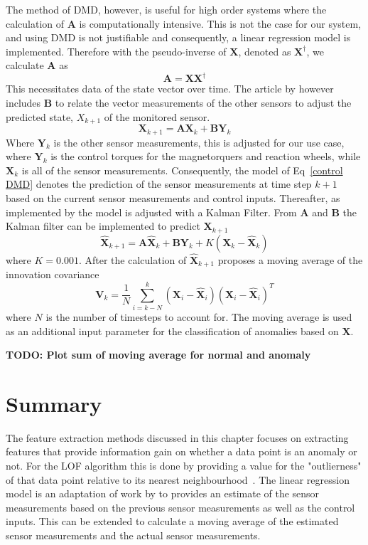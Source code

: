 The method of DMD, however, is useful for high order systems where the calculation of $\mathbf{A}$ is computationally intensive. This is not the case for our system, and using DMD is not justifiable and consequently, a linear regression model is implemented. Therefore with the pseudo-inverse of $\mathbf{X}$, denoted as $\mathbf{X^{\dagger}}$, we calculate $\mathbf{A}$ as
\begin{equation}
	\mathbf{A} = \mathbf{X}\mathbf{X^{\dagger}}
\end{equation}
This necessitates data of the state vector over time. The article by \cite{DeSilva2020} however includes $\mathbf{B}$ to relate the vector measurements of the other sensors to adjust the predicted state, $X_{k+1}$ of the monitored sensor. 
\begin{equation}
	\mathbf{X}_{k+1} = \mathbf{AX}_k + \mathbf{BY}_k
	\label{control DMD}
\end{equation}
Where $\mathbf{Y}_k$ is the other sensor measurements, this is adjusted for our use case, where $\mathbf{Y}_k$ is the control torques for the magnetorquers and reaction wheels, while $\mathbf{X}_k$ is all of the sensor measurements. Consequently, the model of Eq~\ref{control DMD} denotes the prediction of the sensor measurements at time step $k+1$ based on the current sensor measurements and control inputs.
Thereafter, as implemented by \cite{DeSilva2020} the model is adjusted with a Kalman Filter. From $\mathbf{A}$ and $\mathbf{B}$ the Kalman filter can be implemented to predict $\mathbf{X}_{k+1}$
\begin{equation}
	\hat{\mathbf{X}}_{k+1} = \mathbf{A}\hat{\mathbf{X}}_k + \mathbf{B}\mathbf{Y}_k + K(\mathbf{X}_k - \hat{\mathbf{X}}_k)
\end{equation}
where $K = 0.001$. After the calculation of $\hat{\mathbf{X}}_{k+1}$ \cite{DeSilva2020} proposes a moving average of the innovation covariance
\begin{equation}
	\mathbf{V}_k = \frac{1}{N} \sum_{i=k-N}^k (\mathbf{X}_i - \hat{\mathbf{X}}_i)(\mathbf{X}_i - \hat{\mathbf{X}}_i)^T
\end{equation}
where $N$ is the number of timesteps to account for. The moving average is used as an additional input parameter for the classification of anomalies based on $\mathbf{X}$.

\textbf{TODO: Plot sum of moving average for normal and anomaly}

\section{Summary}
The feature extraction methods discussed in this chapter focuses on extracting features that provide information gain on whether a data point is an anomaly or not. For the LOF algorithm this is done by providing a value for the "outlierness" of that data point relative to its nearest neighbourhood~\cite{breunig2000lof}. The linear regression model is an adaptation of work by \cite{DeSilva2020} to provides an estimate of the sensor measurements based on the previous sensor measurements as well as the control inputs. This can be extended to calculate a moving average of the estimated sensor measurements and the actual sensor measurements.